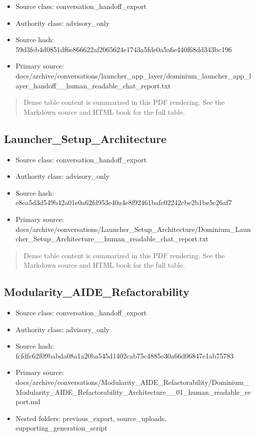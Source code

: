 \documentclass[11pt,a4paper]{report}
\begin{document}
\begin{itemize}
\item Source class: conversation\_handoff\_export
\item Authority class: advisory\_only
\item Source hash: 59d3feb4d0851df6e866622af2065624e1743a5fde0a5a6e440f68dd343bc196
\item Primary source: docs/archive/conversations/launcher\_app\_layer/dominium\_launcher\_app\_layer\_handoff\_\_human\_readable\_chat\_report.txt
\end{itemize}

\begin{quote}\small Dense table content is summarized in this PDF rendering. See the Markdown source and HTML book for the full table.\end{quote}

\subsection{Launcher\_Setup\_Architecture}

\begin{itemize}
\item Source class: conversation\_handoff\_export
\item Authority class: advisory\_only
\item Source hash: e8ea5d3d549b42a01e0a62fd953e40a4e8f92461bafc02242cbe2b1be5c26af7
\item Primary source: docs/archive/conversations/Launcher\_Setup\_Architecture/Dominium\_Launcher\_Setup\_Architecture\_\_human\_readable\_chat\_report.txt
\end{itemize}

\begin{quote}\small Dense table content is summarized in this PDF rendering. See the Markdown source and HTML book for the full table.\end{quote}

\subsection{Modularity\_AIDE\_Refactorability}

\begin{itemize}
\item Source class: conversation\_handoff\_export
\item Authority class: advisory\_only
\item Source hash: fcfdfc62f09babda08a1a20ba545d1402cab75c4885e30a66d06847e1ab75783
\item Primary source: docs/archive/conversations/Modularity\_AIDE\_Refactorability/Dominium\_Modularity\_AIDE\_Refactorability\_Architecture\_\_01\_human\_readable\_report.md
\item Nested folders: previous\_export, source\_uploads, supporting\_generation\_script
\end{itemize}
\end{document}
